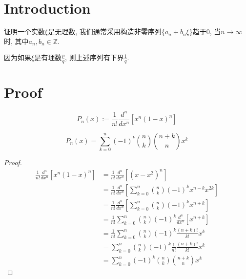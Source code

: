 %

\chapter{Introduction}

证明一个实数$\xi$是无理数, 我们通常采用构造非零序列$\{a_n + b_n\xi\}$趋于$0$, 当$n \rightarrow \infty$时, 其中$a_n, b_n \in \mathbb{Z}$.

因为如果$\xi$是有理数$\frac{p}{q}$, 则上述序列有下界$\frac{1}{q}$.

\chapter{Proof}

\begin{definition}\label{Legendre_poly}
    \leanok
    \[ P_n(x):=\frac{1}{n!}\frac{d^n}{dx^n}[x^n(1-x)^n] \]
\end{definition}

\begin{lemma}\label{Legendre_poly_is_int}
    \[ P_n(x)=\sum\limits_{k=0}^{n}(-1)^k\binom{n}{k}\binom{n+k}{n}x^k \]
\end{lemma}
\begin{proof}
    \leanok
    \begin{align*}
        \frac{1}{n!}\frac{d^n}{dx^n}[x^n(1-x)^n] &= \frac{1}{n!}\frac{d^n}{dx^n}[(x-x^2)^n]\\
        &= \frac{1}{n!}\frac{d^n}{dx^n}[\sum\limits_{k=0}^{n} \binom{n}{k}(-1)^k x^{n-k}x^{2k}]\\
        &= \frac{1}{n!}\frac{d^n}{dx^n}[\sum\limits_{k=0}^{n} \binom{n}{k}(-1)^k x^{n+k}]\\
        &= \frac{1}{n!}\sum\limits_{k=0}^{n} \binom{n}{k}(-1)^k \frac{d^n}{dx^n}[x^{n+k}]\\
        &= \frac{1}{n!}\sum\limits_{k=0}^{n} \binom{n}{k}(-1)^k \frac{(n+k)!}{k!}x^{k}\\
        &= \sum\limits_{k=0}^{n} \binom{n}{k}(-1)^k \frac{1}{n!}\frac{(n+k)!}{k!}x^{k}\\
        &= \sum\limits_{k=0}^{n} (-1)^k \binom{n}{k}\binom{n+k}{n}x^{k}
    \end{align*}
\end{proof}

